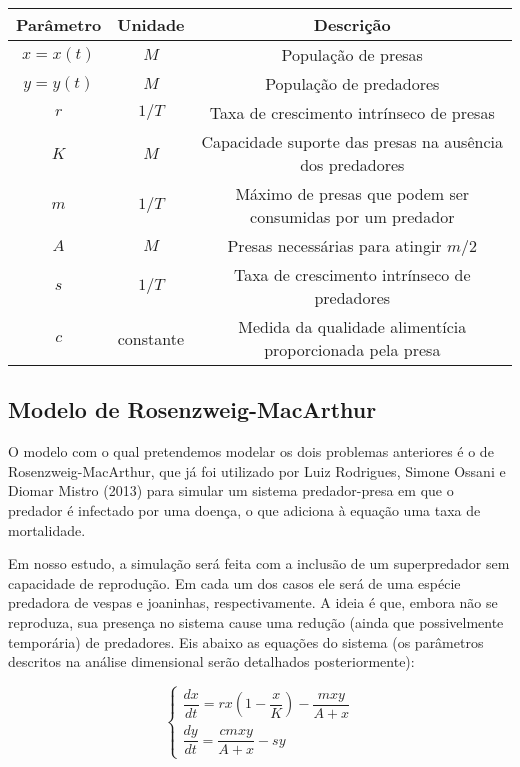 \begin{center}
\begin{tabular}{| c | c | c |}
\hline
Parâmetro & Unidade & Descrição\\
\hline
$x=x(t)$ & $M$ & População de presas\\
$y=y(t)$ & $M$ & População de predadores\\
$r$ & $1/T$ & Taxa de crescimento intrínseco de presas\\
$K$ & $M$ & Capacidade suporte das presas na ausência dos predadores\\
$m$ & $1/T$ & Máximo de presas que podem ser consumidas por um predador\\
$A$ & $M$ & Presas necessárias para atingir $m/2$\\
$s$ & $1/T$ & Taxa de crescimento intrínseco de predadores\\
$c$ & constante & Medida da qualidade alimentícia proporcionada pela presa\\
\hline
\end{tabular}
\end{center}

\newpage

\subsection{Modelo de Rosenzweig-MacArthur}

O modelo com o qual pretendemos modelar os dois problemas anteriores é o de Rosenzweig-MacArthur, que já foi utilizado por Luiz Rodrigues, Simone Ossani e Diomar Mistro (2013) \cite{lr_so_dm_2013} para simular um sistema predador-presa em que o predador é infectado por uma doença, o que adiciona à equação uma taxa de mortalidade. 

Em nosso estudo, a simulação será feita com a inclusão de um superpredador sem capacidade de reprodução. Em cada um dos casos ele será de uma espécie predadora de vespas e joaninhas, respectivamente. A ideia é que, embora não se reproduza, sua presença no sistema cause uma redução (ainda que possivelmente temporária) de predadores. Eis abaixo as equações do sistema (os parâmetros descritos na análise dimensional serão detalhados posteriormente):

$$\left\{
\begin{array}{l}
\dfrac{dx}{dt}=rx\left(1-\dfrac{x}{K}\right)-\dfrac{mxy}{A+x}\\
\dfrac{dy}{dt}=\dfrac{cmxy}{A+x}-sy
\end{array}
\right.$$

